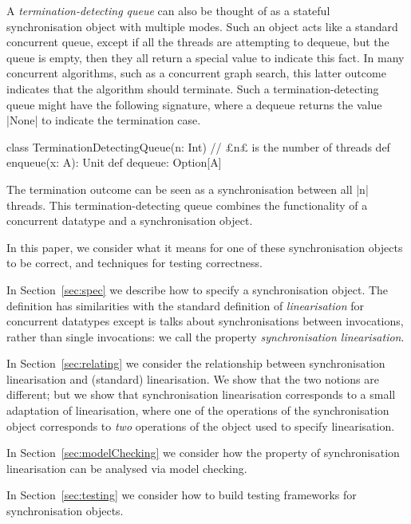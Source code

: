 A \emph{termination-detecting queue} can also be thought of as a stateful
synchronisation object with multiple modes.  Such an object acts like a
standard concurrent queue, except if all the threads are attempting to
dequeue, but the queue is empty, then they all return a special value to
indicate this fact.  In many concurrent algorithms, such as a concurrent graph
search, this latter outcome indicates that the algorithm should terminate.
Such a termination-detecting queue might have the following signature, where a
dequeue returns the value |None| to indicate the termination case.
%
\begin{scala}
class TerminationDetectingQueue(n: Int){ // £n£ is the number of threads   
  def enqueue(x: A): Unit
  def dequeue: Option[A]
}
\end{scala} 
%
The termination outcome can be seen as a synchronisation between all |n|
threads.  This termination-detecting queue combines the functionality of a
concurrent datatype and a synchronisation object.



In this paper, we consider what it means for one of these synchronisation
objects to be correct, and techniques for testing correctness.  

In Section~\ref{sec:spec} we describe how to specify a synchronisation
object.  The definition has similarities with the standard definition of
\emph{linearisation} for concurrent datatypes except is talks about
synchronisations between invocations, rather than single invocations: we call
the property \emph{synchronisation linearisation}. 

In Section~\ref{sec:relating} we consider the relationship between
synchronisation linearisation and (standard) linearisation.  We show that the
two notions are different; but we show that synchronisation linearisation
corresponds to a small adaptation of linearisation, where one of the
operations of the synchronisation object corresponds to \emph{two} operations
of the object used to specify linearisation.  

In Section~\ref{sec:modelChecking} we consider how the property of
synchronisation linearisation can be analysed via model checking.  

In Section~\ref{sec:testing} we consider how to build testing frameworks for
synchronisation objects. 
